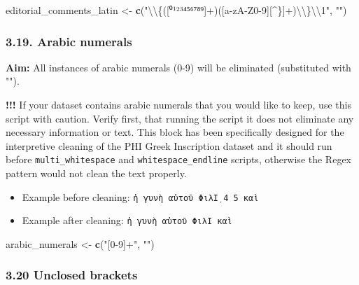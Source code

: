 \documentclass[]{article}
\newenvironment{Shaded}{\begin{snugshade}}{\end{snugshade}}
\newcommand{\CharTok}[1]{\textcolor[rgb]{0.31,0.60,0.02}{#1}}
\newcommand{\KeywordTok}[1]{\textcolor[rgb]{0.13,0.29,0.53}{\textbf{#1}}}
\newcommand{\NormalTok}[1]{#1}
\newcommand{\StringTok}[1]{\textcolor[rgb]{0.31,0.60,0.02}{#1}}
\providecommand{\tightlist}{%
  \setlength{\itemsep}{0pt}\setlength{\parskip}{0pt}}
\begin{document}
\begin{Shaded}
\begin{Highlighting}[]
\NormalTok{editorial_comments_latin <-}\StringTok{ }\KeywordTok{c}\NormalTok{(}\StringTok{"}\CharTok{\textbackslash{}\textbackslash{}}\StringTok{\{([⁰¹²³⁴⁵⁶⁷⁸⁹]+)([a-zA-Z0-9][^\}]+)}\CharTok{\textbackslash{}\textbackslash{}}\StringTok{\}}\CharTok{\textbackslash{}\textbackslash{}}\StringTok{1"}\NormalTok{, }\StringTok{""}\NormalTok{)}
\end{Highlighting}
\end{Shaded}

\hypertarget{arabic-numerals}{%
\subsubsection{3.19. Arabic numerals}\label{arabic-numerals}}

\textbf{Aim:} All instances of arabic numerals (0-9) will be eliminated
(substituted with "").

\textbf{!!!} If your dataset contains arabic numerals that you would
like to keep, use this script with caution. Verify first, that running
the script it does not eliminate any necessary information or text. This
block has been specifically designed for the interpretive cleaning of
the PHI Greek Inscription dataset and it should run before
\texttt{multi\_whitespace} and \texttt{whitespace\_endline} scripts,
otherwise the Regex pattern would not clean the text properly.

\begin{itemize}
\tightlist
\item
  Example before cleaning: \texttt{ἡ\ γυνὴ\ αὐτοῦ\ ΦιλΙ̣\ 4\ 5\ καὶ}
\item
  Example after cleaning: \texttt{ἡ\ γυνὴ\ αὐτοῦ\ ΦιλΙ\ καὶ}
\end{itemize}

\begin{Shaded}
\begin{Highlighting}[]
\NormalTok{arabic_numerals <-}\StringTok{ }\KeywordTok{c}\NormalTok{(}\StringTok{"[0-9]+"}\NormalTok{, }\StringTok{""}\NormalTok{)}
\end{Highlighting}
\end{Shaded}

\hypertarget{unclosed-brackets}{%
\subsubsection{3.20 Unclosed brackets}\label{unclosed-brackets}}
\end{document}
